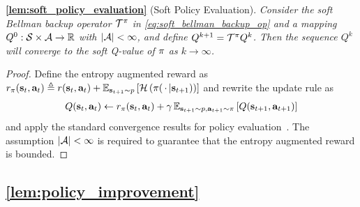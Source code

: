 \textbf{\autoref{lem:soft_policy_evaluation}} (Soft Policy Evaluation).\textit{
Consider the soft Bellman backup operator $\mathcal{T}^\pi$ in \autoref{eq:soft_bellman_backup_op} and a mapping $Q^0: \mathcal{S} \times \mathcal{A}\rightarrow \mathbb{R}$ with $|\mathcal{A}|<\infty$, and define $Q^{k+1} = \mathcal{T}^\pi Q^k$. Then the sequence $Q^k$ will converge to the soft Q-value of $\pi$ as $k\rightarrow \infty$.}
\begin{proof}
Define the entropy augmented reward as $r_\pi({\mathbf{s}_t}, {\mathbf{a}_t}) \triangleq r({\mathbf{s}_t}, {\mathbf{a}_t})  + \operatorname{\mathbb{E}}_{{\mathbf{s}_{t+1}}\sim p}\left[\mathcal{H}\left(\pi({\,\cdot\,}|{\mathbf{s}_{t+1}})\right)\right]$ and rewrite the update rule as 
\begin{align}
Q({\mathbf{s}_t}, {\mathbf{a}_t}) \leftarrow r_\pi({\mathbf{s}_t}, {\mathbf{a}_t}) + \gamma \operatorname{\mathbb{E}}_{{\mathbf{s}_{t+1}}\sim p,{\mathbf{a}_{t+1}} \sim \pi}\left[Q({\mathbf{s}_{t+1}}, {\mathbf{a}_{t+1}})\right]
\end{align}
and apply the standard convergence results for policy evaluation~\citep{sutton1998reinforcement}. The assumption $|\mathcal{A}|<\infty$ is required to guarantee that the entropy augmented reward is bounded.
\end{proof}


\subsection{\autoref{lem:policy_improvement}}
\label{app:lem_policy_improvement}


